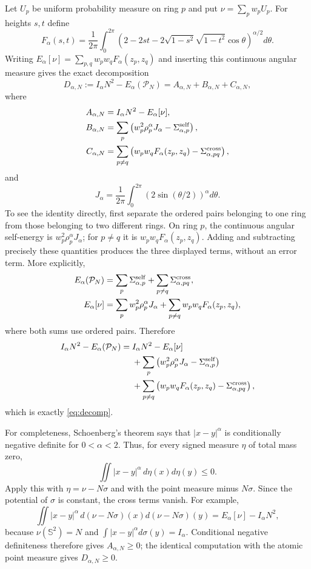 \documentclass[11pt]{amsart}
\newcommand{\Sph}{\mathbb S^2}
\newcommand{\cP}{\mathcal P}
\begin{document}
Let $U_p$ be uniform probability measure on ring $p$ and put
$\nu=\sum_pw_pU_p$.  For heights $s,t$ define
\[
 F_\alpha(s,t)=\frac1{2\pi}\int_0^{2\pi}
 \left(2-2st-2\sqrt{1-s^2}\sqrt{1-t^2}\cos\theta
 \right)^{\alpha/2}d\theta.
\]
Writing $E_\alpha[\nu]=\sum_{p,q}w_pw_qF_\alpha(z_p,z_q)$ and inserting
this continuous angular measure gives the exact decomposition
\begin{equation}\label{eq:decomp}
 D_{\alpha,N}:=I_\alpha N^2-E_\alpha(\cP_N)
 =A_{\alpha,N}+B_{\alpha,N}+C_{\alpha,N},             \tag{2.1}
\end{equation}
where
\begin{align*}
 A_{\alpha,N}&=I_\alpha N^2-E_\alpha[\nu],\\
 B_{\alpha,N}&=\sum_p\left(w_p^2\rho_p^\alpha J_\alpha
                    -\Sigma_{\alpha,p}^{\rm self}\right),\\
 C_{\alpha,N}&=\sum_{p\ne q}\left(w_pw_qF_\alpha(z_p,z_q)
                    -\Sigma_{\alpha,pq}^{\rm cross}\right),
\end{align*}
and
\[
 J_\alpha=\frac1{2\pi}\int_0^{2\pi}
 (2\sin(\theta/2))^\alpha d\theta.
\]
To see the identity directly, first separate the ordered pairs belonging to
one ring from those belonging to two different rings.  On ring $p$, the
continuous angular self-energy is $w_p^2\rho_p^\alpha J_\alpha$; for
$p\ne q$ it is $w_pw_qF_\alpha(z_p,z_q)$.  Adding and subtracting precisely
these quantities produces the three displayed terms, without an error term.
More explicitly,
\begin{align*}
 E_\alpha(\cP_N)
 &=\sum_p\Sigma_{\alpha,p}^{\rm self}
   +\sum_{p\ne q}\Sigma_{\alpha,pq}^{\rm cross},\\
 E_\alpha[\nu]
 &=\sum_pw_p^2\rho_p^\alpha J_\alpha
   +\sum_{p\ne q}w_pw_qF_\alpha(z_p,z_q),
\end{align*}
where both sums use ordered pairs.  Therefore
\begin{align*}
 I_\alpha N^2-E_\alpha(\cP_N)
={}&I_\alpha N^2-E_\alpha[\nu]\\
 &+\sum_p\left(w_p^2\rho_p^\alpha J_\alpha
                    -\Sigma_{\alpha,p}^{\rm self}\right)\\
 &+\sum_{p\ne q}\left(w_pw_qF_\alpha(z_p,z_q)
                    -\Sigma_{\alpha,pq}^{\rm cross}\right),
\end{align*}
which is exactly \eqref{eq:decomp}.

For completeness, Schoenberg's theorem says that $|x-y|^\alpha$ is
conditionally negative definite for $0<\alpha<2$.  Thus, for every signed
measure $\eta$ of total mass zero,
\[
 \iint |x-y|^\alpha\,d\eta(x)d\eta(y)\le0.
\]
Apply this with $\eta=\nu-N\sigma$ and with the point measure minus
$N\sigma$.  Since the potential of $\sigma$ is constant, the cross terms
vanish.  For example,
\[
 \iint |x-y|^\alpha\,d(\nu-N\sigma)(x)d(\nu-N\sigma)(y)
 =E_\alpha[\nu]-I_\alpha N^2,
\]
because $\nu(\Sph)=N$ and
$\int|x-y|^\alpha d\sigma(y)=I_\alpha$.  Conditional negative
definiteness therefore gives $A_{\alpha,N}\ge0$; the identical computation
with the atomic point measure gives $D_{\alpha,N}\ge0$.
\end{document}

